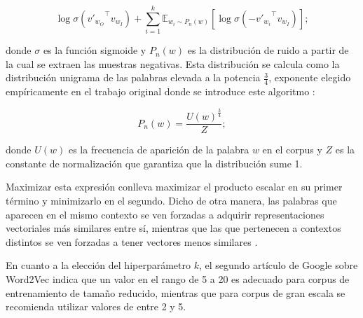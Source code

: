 \[
  \log \sigma\!\left({v'_{w_O}}^{\!\top} v_{w_I}\right)
  + \sum_{i=1}^{k} \mathbb{E}_{w_i \sim P_n(w)}\!\left[\log \sigma\!\left(-{v'_{w_i}}^{\!\top} v_{w_I}\right)\right];
\]

donde $\sigma$ es la función sigmoide y $P_n(w)$ es la distribución de ruido a partir de la cual se extraen las muestras negativas. Esta distribución se calcula como la distribución unigrama de las palabras elevada a la potencia $\frac{3}{4}$, exponente elegido empíricamente en el trabajo original donde se introduce este algoritmo \cite{mikolov_skipgram_phrases_2013}:

\[
  P_n(w) = \frac{U(w)^{\frac{3}{4}}}{Z};
\]

donde $U(w)$ es la frecuencia de aparición de la palabra $w$ en el corpus y $Z$ es la constante de normalización que garantiza que la distribución sume 1.

Maximizar esta expresión conlleva maximizar el producto escalar en su primer término y minimizarlo en el segundo. Dicho de otra manera, las palabras que aparecen en el mismo contexto se ven forzadas a adquirir representaciones vectoriales más similares entre sí, mientras que las que pertenecen a contextos distintos se ven forzadas a tener vectores menos similares \cite{karimi_negative_sampling_baeldung_2025}.

En cuanto a la elección del hiperparámetro $k$, el segundo artículo de Google sobre Word2Vec \cite{mikolov_skipgram_phrases_2013} indica que un valor en el rango de 5 a 20 es adecuado para corpus de entrenamiento de tamaño reducido, mientras que para corpus de gran escala se recomienda utilizar valores de entre 2 y 5.


